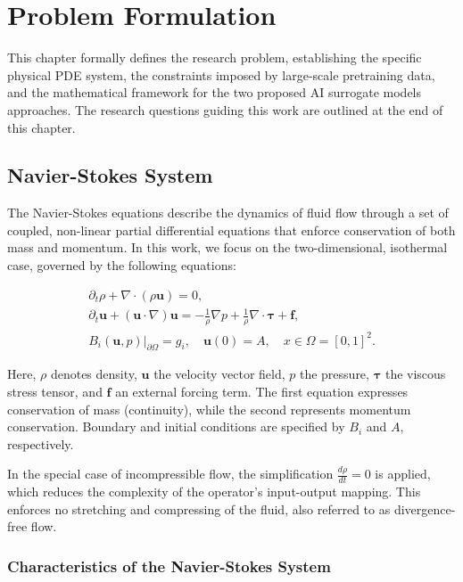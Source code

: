\chapter{Problem Formulation}\label{ch:problem}

This chapter formally defines the research problem, establishing the specific physical PDE system, the constraints imposed by large-scale pretraining data, and the mathematical framework for the two proposed AI surrogate models approaches. The research questions guiding this work are outlined at the end of this chapter.

\section{Navier-Stokes System}

The Navier-Stokes equations describe the dynamics of fluid flow through a set of coupled, non-linear partial differential equations that enforce conservation of both mass and momentum. In this work, we focus on the two-dimensional, isothermal case, governed by the following equations:

\begin{gather}\label{eq:navierstokes}
\partial_t \rho + \nabla \cdot (\rho \mathbf{u}) = 0, \\
\partial_t \mathbf{u} + (\mathbf{u} \cdot \nabla) \mathbf{u} = -\frac{1}{\rho} \nabla p + \frac{1}{\rho} \nabla \cdot \boldsymbol{\tau} + \mathbf{f}, \\
B_i(\mathbf{u}, p)|_{\partial \Omega} = g_i, \quad \mathbf{u}(0) = A, \quad x \in \Omega=[0,1]^2.
\end{gather}

Here, $\rho$ denotes density, $\mathbf{u}$ the velocity vector field, $p$ the pressure, $\boldsymbol{\tau}$ the viscous stress tensor, and $\mathbf{f}$ an external forcing term. The first equation expresses conservation of mass (continuity), while the second represents momentum conservation. Boundary and initial conditions are specified by $B_i$ and $A$, respectively.

In the special case of incompressible flow, the simplification $\frac{d\rho}{dt} = 0$ is applied, which reduces the complexity of the operator's input-output mapping. This enforces no stretching and compressing of the fluid, also referred to as divergence-free flow.

\subsection{Characteristics of the Navier-Stokes System}\label{sec:energyspectra}

